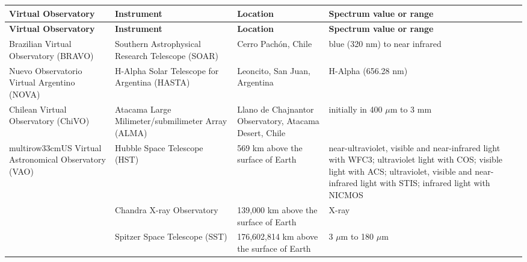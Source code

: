 \begin{center}  
\begin{longtable}{|m{3cm}|m{3cm}|m{3cm}|m{5cm}|}
    \hline                                                                      
    \textbf{Virtual Observatory} & \textbf{Instrument} & \textbf{Location} &
    \textbf{Spectrum value or range} \\
    \hline                                                                      
    \endfirsthead
    \hline                                                                      
    \textbf{Virtual Observatory} & \textbf{Instrument} & \textbf{Location} &
    \textbf{Spectrum value or range} \\
    \hline                                                                      
    \endhead
    Brazilian Virtual Observatory (BRAVO) & Southern Astrophysical Research
    Telescope (SOAR) & Cerro Pach\'{o}n, Chile & blue (320 nm) to near infrared
    \cite{website:SOAR_EMS} \\
    \hline                                                                      
    Nuevo Observatorio Virtual Argentino (NOVA) & H-Alpha Solar Telescope for
    Argentina (HASTA) & Leoncito, San Juan, Argentina & H-Alpha (656.28 nm)
    \cite{website:HASTA_EMS} \\
    \hline
    Chilean Virtual Observatory (ChiVO) & Atacama Large Milimeter/submilimeter
    Array (ALMA) & Llano de Chajnantor Observatory, Atacama Desert, Chile &
    initially in 400 $ \mu $m to 3 mm \cite{website:ALMA_EMS} \\
    \hline
    multirow{3}{3cm}{US Virtual Astronomical Observatory (VAO)} & Hubble Space
    Telescope (HST) & 569 km above the surface of Earth & near-ultraviolet,
    visible and near-infrared light with WFC3; ultraviolet light with COS;
    visible light with ACS; ultraviolet, visible and near-infrared light with
    STIS; infrared light with NICMOS \cite{website:HST_EMS} \\
     \cline{2-4}
     & Chandra X-ray Observatory & 139,000 km above the surface of Earth & X-ray
     \cite{website:Chandra_EMS} \\
     \cline{2-4}
     & Spitzer Space Telescope (SST) & 176,602,814 km above the surface of Earth
     \cite{website:SST_EMS_1} & 3 $ \mu $m to 180 $ \mu $m
     \cite{website:SST_EMS_2} \\

\end{longtable}
\end{center}
